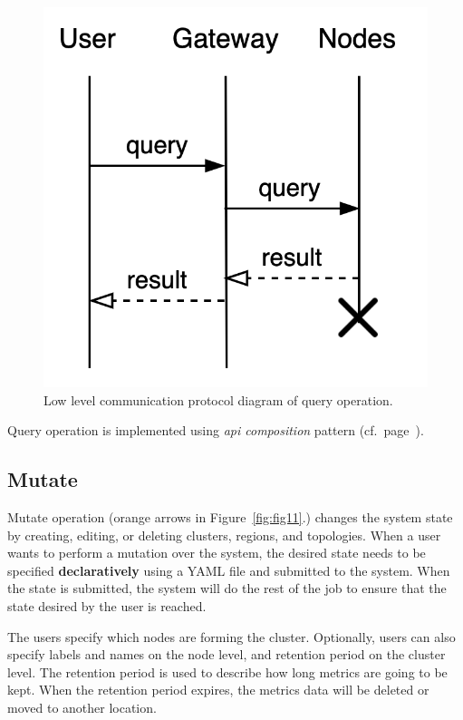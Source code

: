 \begin{figure}[H]
	\begin{center}
		\includegraphics[scale=1]{images/Figure14}
	\end{center}
	\vspace{-0.7cm}
	\caption{Low level communication protocol diagram of query operation.}
	\label{fig:fig14}
\end{figure}

\noindent
Query operation is implemented using \emph{api composition} pattern (cf.~page~\pageref{par:composition}).
%
%
\subsection{Mutate}\label{sec:mutate} 
%
Mutate operation (orange arrows in Figure~\ref{fig:fig11}.) changes the system state by creating, editing, or deleting clusters, regions, and topologies. When a user wants to perform a mutation over the system, the desired state needs to be specified \textbf{declaratively} using a YAML file and submitted to the system. When the state is submitted, the system will do the rest of the job to ensure that the state desired by the user is reached.

The users specify which nodes are forming the cluster. Optionally, users can also specify labels and names on the node level, and retention period on the cluster level. The retention period is used to describe how long metrics are going to be kept. When the retention period expires, the metrics data will be deleted or moved to another location. 

